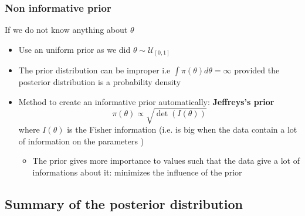 \begin{frame}\frametitle{Non informative prior}
If we do not know anything about $\theta$
  \begin{itemize}
\item Use an uniform prior as we did $\theta \sim \mathcal{U}_{[0,1]}$
\item The prior distribution can be improper  i.e $\int \pi(\theta) d \theta  = \infty$ provided the posterior distribution is a probability density
    \item Method to create an informative prior automatically:  \textbf{Jeffreys's prior}
    $$ \pi(\theta) \propto \sqrt{\det(I(\theta))}$$  where  $I(\theta)$ is the Fisher information (i.e. is big when the data contain a lot of information on the parameters )
    \begin{itemize}
    \item The prior gives more importance to values  such that  the data give a lot of informations about it:  minimizes the influence of the prior
    \end{itemize}
\end{itemize}
 
  
\end{frame}

\subsection{Summary of the posterior distribution}


